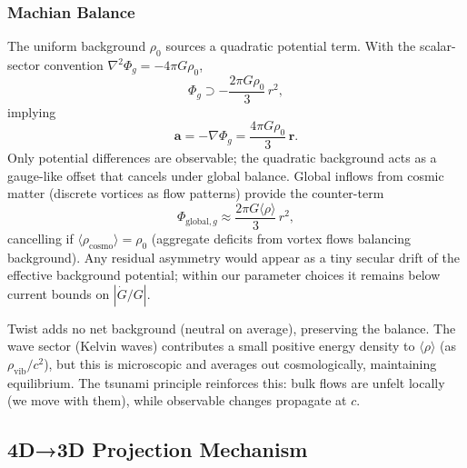 \subsubsection{Machian Balance}
The uniform background $\rho_0$ sources a quadratic potential term. With the scalar-sector convention $\nabla^2 \Phi_g=-4\pi G\rho_0$,
\begin{equation}
\Phi_g \supset -\frac{2\pi G \rho_0}{3}\,r^2,
\end{equation}
implying
\begin{equation}
\mathbf{a} = -\nabla \Phi_g = \frac{4\pi G \rho_0}{3}\,\mathbf{r}.
\end{equation}
Only potential differences are observable; the quadratic background acts as a gauge-like offset that cancels under global balance. Global inflows from cosmic matter (discrete vortices as flow patterns) provide the counter-term
\begin{equation}
\Phi_{\text{global},g} \approx \frac{2\pi G \langle \rho \rangle}{3}\, r^2,
\end{equation}
cancelling if $\langle \rho_{\text{cosmo}} \rangle = \rho_0$ (aggregate deficits from vortex flows balancing background). Any residual asymmetry would appear as a tiny secular drift of the effective background potential; within our parameter choices it remains below current bounds on $|\dot G/G|$.

Twist adds no net background (neutral on average), preserving the balance. The wave sector (Kelvin waves) contributes a small positive energy density to $\langle \rho \rangle$ (as $\rho_{\text{vib}}/c^2$), but this is microscopic and averages out cosmologically, maintaining equilibrium. The tsunami principle reinforces this: bulk flows are unfelt locally (we move with them), while observable changes propagate at $c$.

\medskip
{}
\medskip

\subsection{4D→3D Projection Mechanism}

